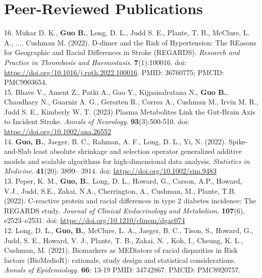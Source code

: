 \section{Peer-Reviewed Publications}

\vspace{-3ex}


16. Mukaz D. K., \textbf{Guo B.}, Long, D. L., Judd S. E., Plante, T. B., McClure, L. A., ...,  Cushman M. (2022). D-dimer and the Risk of Hypertension: The REasons for Geographic and Racial Differences in Stroke (REGARDS). \textit{Research and Practice in Thrombosis and Haemostasis}. {\bf 7}(1):100016. doi: \url{https://doi.org/10.1016/j.rpth.2022.100016}. PMID: 36760775; PMCID: PMC9903654.\\

15. Bhave V., Ament Z., Patki A., Gao Y., Kijpaisalratana N., \textbf{Guo B.}, Chaudhary N., Guarniz A. G., Gerszten R., Correa A., Cushman M., Irvin M. R., Judd S. E., Kimberly W. T. (2023) Plasma Metabolites Link the Gut-Brain Axis to Incident Stroke. {\it Annals of Neurology}. {\bf 93}(3):500-510.  doi: \url{https://doi.org/10.1002/ana.26552}\\

14. \textbf{Guo, B.}, Jaeger, B. C., Rahman, A. F., Long, D. L., Yi, N. (2022). Spike-and-Slab least absolute shrinkage and selection operator generalized additive models and scalable algorithms for high-dimensional data analysis. {\it Statistics in Medicine}. {\bf 41}(20): 3899– 3914. doi: \url{https://doi.org/10.1002/sim.9483}\\

13. Peper, K. M., \textbf{Guo, B.}, Long, D. L., Howard, G., Carson, A.P., Howard, V.J., Judd, S.E., Zakai, N.A., Cherrington, A., Cushman, M., Plante, T.B. (2022). C-reactive protein and racial differences in type 2 diabetes incidence: The REGARDS study. {\it Journal of Clinical Endocrinology and Metabolism}. {\bf 107}(6), e2523–e2531. doi: \url{https://doi.org/10.1210/clinem/dgac074}\\

12. Long, D. L., \textbf{Guo, B.}, McClure, L. A., Jaeger, B. C., Tison, S., Howard, G., Judd, S. E., Howard, V. J., Plante, T. B., Zakai, N. , Koh, I., Cheung, K. L., Cushman, M. (2021). Biomarkers as MEDiators of racial disparities in Risk factors (BioMedioR): rationale, study design and statistical considerations. \textit{Annals of Epidemiology.} {\bf 66}: 13-19 PMID: 34742867. PMCID: PMC8920757. \\

